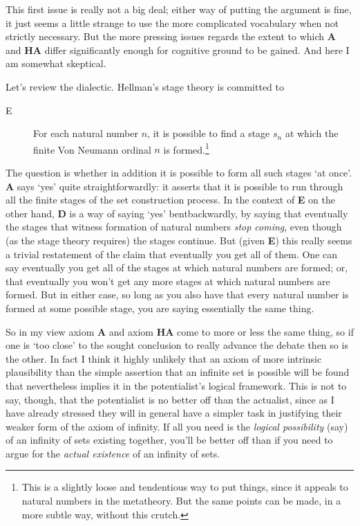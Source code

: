 \documentclass{amsart}
\theoremstyle{definition}
\begin{document}
This first issue is really not a big deal; either way of putting the argument
is fine, it just seems a little strange to use the more complicated 
vocabulary when not strictly necessary. But the more pressing issues
regards the extent to which {\bf A} and {\bf HA} differ significantly 
enough for cognitive ground to be gained. And here I am somewhat skeptical.

Let's review the dialectic. Hellman's stage theory is committed to 

\begin{description} 
    \item[E] For each natural number $n$, 
    it is possible to find a stage $s_n$ at which the 
    finite Von Neumann ordinal $n$ is formed.\footnote{
        This is a slightly loose and tendentious way to put things,
        since it appeals to natural numbers in the metatheory. But
        the same points can be made, in a more subtle way, without
        this crutch.
    }
\end{description} 
The question is whether in addition it is possible to form 
all such stages `at once'. {\bf A} says `yes' quite straightforwardly: 
it asserts that it is possible to run through all the finite stages 
of the set construction process. In the context of {\bf E} on the other hand, 
{\bf D} is a way of saying `yes' bentbackwardly, by saying that eventually 
the stages that witness formation of natural numbers \emph{stop coming}, 
even though (as the stage theory requires) the stages continue. 
But (given {\bf E}) this really seems a trivial restatement of the 
claim that eventually you get all of them.  One can say eventually you get 
all of the stages at which natural numbers 
are formed; or, that eventually you won't get any more stages at which natural 
numbers are formed. But in either case,
so long as you also have that every natural 
number is formed at some possible stage,
you are saying essentially the same thing.

So in my view axiom {\bf A} and axiom {\bf HA} come to more or less the 
same thing, so if one is `too close' to the sought conclusion to really advance 
the debate then so is the other. In fact I think it highly unlikely that an axiom 
of more intrinsic plausibility than the simple assertion that an infinite set is possible 
will be found that nevertheless implies it in the potentialist's logical framework.  
This is not to say, though, that the potentialist is no better off than the actualist, 
since as I have already stressed they will in general have a simpler task in justifying 
their weaker form of the axiom of infinity. If all you need is the \emph{logical possibility}
(say) of an infinity of sets existing together, you'll be better off than if you 
need to argue for the \emph{actual existence} of an infinity of sets.
\end{document}

